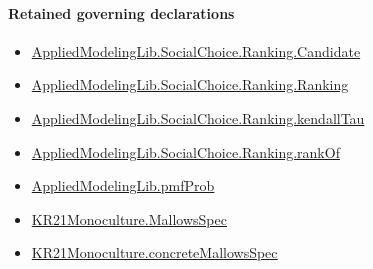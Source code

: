 \documentclass[10pt]{article}
\begin{document}
\paragraph{Retained governing declarations}
\begin{itemize}\raggedright
\item \hyperlink{library-prerequisite-8c0e6c25845ae78a}{Applied\allowbreak{}Modeling\allowbreak{}Lib.\allowbreak{}Social\allowbreak{}Choice.\allowbreak{}Ranking.\allowbreak{}Candidate}
\item \hyperlink{library-prerequisite-5cde54446d1ae021}{Applied\allowbreak{}Modeling\allowbreak{}Lib.\allowbreak{}Social\allowbreak{}Choice.\allowbreak{}Ranking.\allowbreak{}Ranking}
\item \hyperlink{governing-declaration-127efd44d176e2ba}{Applied\allowbreak{}Modeling\allowbreak{}Lib.\allowbreak{}Social\allowbreak{}Choice.\allowbreak{}Ranking.\allowbreak{}kendall\allowbreak{}Tau}
\item \hyperlink{governing-declaration-ef804e95c0f14f7c}{Applied\allowbreak{}Modeling\allowbreak{}Lib.\allowbreak{}Social\allowbreak{}Choice.\allowbreak{}Ranking.\allowbreak{}rank\allowbreak{}Of}
\item \hyperlink{governing-declaration-9c38d53b9d664221}{Applied\allowbreak{}Modeling\allowbreak{}Lib.\allowbreak{}pmf\allowbreak{}Prob}
\item \hyperlink{governing-declaration-b2e6ec0602659b07}{KR21\allowbreak{}Monoculture.\allowbreak{}Mallows\allowbreak{}Spec}
\item \hyperlink{governing-declaration-0e399c7dd166853c}{KR21\allowbreak{}Monoculture.\allowbreak{}concrete\allowbreak{}Mallows\allowbreak{}Spec}
\end{itemize}
\end{document}
